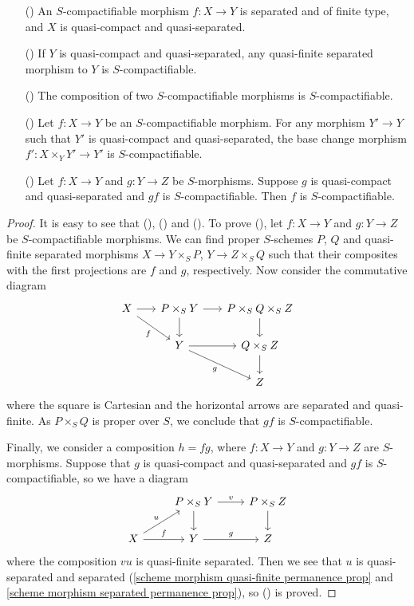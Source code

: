 \begin{proposition}\label{scheme S-compactifiable morphism permanence prop}
\begin{enumerate}
    \item[(\rmnum{1})] An $S$-compactifiable morphism $f:X\to Y$ is separated and of finite type, and $X$ is quasi-compact and quasi-separated.
    \item[(\rmnum{2})] If $Y$ is quasi-compact and quasi-separated, any quasi-finite separated morphism to $Y$ is $S$-compactifiable.
    \item[(\rmnum{3})] The composition of two $S$-compactifiable morphisms is $S$-compactifiable.
    \item[(\rmnum{4})] Let $f:X\to Y$ be an $S$-compactifiable morphism. For any morphism $Y'\to Y$ such that $Y'$ is quasi-compact and quasi-separated, the base change morphism $f':X\times_YY'\to Y'$ is $S$-compactifiable.
    \item[(\rmnum{5})] Let $f:X\to Y$ and $g:Y\to Z$ be $S$-morphisms. Suppose $g$ is quasi-compact and quasi-separated and $gf$ is $S$-compactifiable. Then $f$ is $S$-compactifiable.
\end{enumerate}
\end{proposition}
\begin{proof}
It is easy to see that (), () and (). To prove (), let $f:X\to Y$ and $g:Y\to Z$ be $S$-compactifiable morphisms. We can find proper $S$-schemes $P$, $Q$ and quasi-finite separated morphisms $X\to Y\times_SP$, $Y\to Z\times_SQ$ such that their composites with the first projections are $f$ and $g$, respectively. Now consider the commutative diagram
\[\begin{tikzcd}[column sep=6mm,row sep=6mm]
X\ar[r]\ar[rd,swap,"f"]&P\times_SY\ar[r]\ar[d]&P\times_SQ\times_SZ\ar[d]\\
&Y\ar[r]\ar[rd,swap,"g"]&Q\times_SZ\ar[d]\\
&&Z
\end{tikzcd}\]
where the square is Cartesian and the horizontal arrows are separated and quasi-finite. As $P\times_SQ$ is proper over $S$, we conclude that $gf$ is $S$-compactifiable.\par
Finally, we consider a composition $h=fg$, where $f:X\to Y$ and $g:Y\to Z$ are $S$-morphisms. Suppose that $g$ is quasi-compact and quasi-separated and $gf$ is $S$-compactifiable, so we have a diagram
\[\begin{tikzcd}
&P\times_SY\ar[r,"v"]\ar[d]&P\times_SZ\ar[d]\\
X\ar[ru,"u"]\ar[r,"f"]&Y\ar[r,"g"]&Z
\end{tikzcd}\]
where the composition $vu$ is quasi-finite separated. Then we see that $u$ is quasi-separated and separated (\cref{scheme morphism quasi-finite permanence prop} and \cref{scheme morphism separated permanence prop}), so () is proved.
\end{proof}

